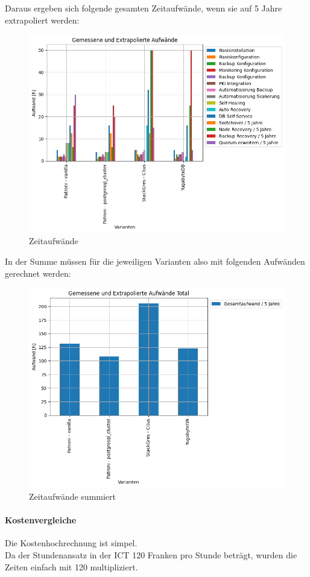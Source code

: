 \begin{flushleft}
    Daraus ergeben sich folgende gesamten Zeitaufwände, wenn sie auf 5 Jahre extrapoliert werden:
    \begin{figure}[H]
        \centering
        \includegraphics[width=1\linewidth]{source/pandas_data_chart_plotter/time_investment}
        \caption{Zeitaufwände}
        \label{fig:time_investment}
    \end{figure}
\end{flushleft}
\begin{flushleft}
    In der Summe müssen für die jeweiligen Varianten also mit folgenden Aufwänden gerechnet werden:
    \begin{figure}[H]
        \centering
        \includegraphics[width=1\linewidth]{source/pandas_data_chart_plotter/time_investment_summe}
        \caption{Zeitaufwände summiert}
        \label{fig:time_investment_summe}
    \end{figure}
    \paragraph{Kostenvergleiche}
    Die Kostenhochrechnung ist simpel.\\
    Da der Stundenansatz in der ICT 120 Franken pro Stunde beträgt, wurden die Zeiten einfach mit 120 multipliziert.
\end{flushleft}

